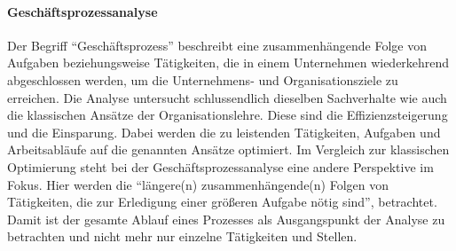 \paragraph{Geschäftsprozessanalyse}
Der Begriff \enquote{Geschäftsprozess} beschreibt eine zusammenhängende Folge von Aufgaben beziehungsweise Tätigkeiten, die in einem Unternehmen wiederkehrend abgeschlossen werden, um die Unternehmens- und Organisationsziele zu erreichen. Die Analyse untersucht schlussendlich dieselben Sachverhalte wie auch die klassischen Ansätze der Organisationslehre. \autocite[vgl.][S.\,5]{staud_geschaftsprozessanalyse_2006} Diese sind die Effizienzsteigerung und die Einsparung. Dabei werden die zu leistenden Tätigkeiten, Aufgaben und Arbeitsabläufe auf die genannten Ansätze optimiert. Im Vergleich zur klassischen Optimierung steht bei der Geschäftsprozessanalyse eine andere Perspektive im Fokus. Hier werden die \enquote{längere(n) zusammenhängende(n) Folgen von Tätigkeiten, die zur Erledigung einer größeren Aufgabe nötig sind}\autocite[][S.\,5]{staud_geschaftsprozessanalyse_2006}, betrachtet. Damit ist der gesamte Ablauf eines Prozesses als Ausgangspunkt der Analyse zu betrachten und nicht mehr nur einzelne Tätigkeiten und Stellen.
\par 
